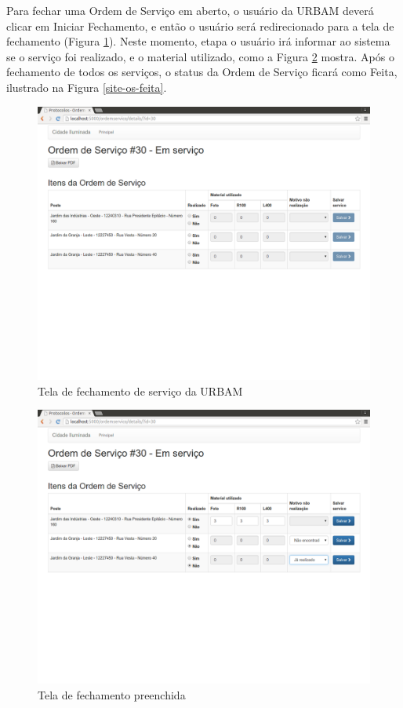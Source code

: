 \documentclass[
	article,			%
	11pt,				%
	oneside,			%
	a4paper,			%
	english,			%
	brazil,				%
	sumario=tradicional
	]{abntex2}
\begin{document}
\clearpage

Para fechar uma Ordem de Serviço em aberto, o usuário da URBAM deverá clicar em Iniciar Fechamento,
e então o usuário será redirecionado para a tela de fechamento (Figura \ref{site-fechamento-urbam}).
Neste momento, etapa o usuário irá informar ao sistema se o serviço foi realizado, e o
material utilizado, como a Figura \ref{site-material-e-motivo} mostra. Após o fechamento de todos os
serviços, o status da Ordem de Serviço ficará como Feita, ilustrado na Figura \ref{site-os-feita}.

\begin{figure}[!htbp]
 \centering
 \caption{\label{site-fechamento-urbam}Tela de fechamento de serviço da URBAM}
 \includegraphics[scale=0.25]{site/15-fechamento_urbam.png}
\end{figure}

\begin{figure}[!htbp]
 \centering
 \caption{\label{site-material-e-motivo}Tela de fechamento preenchida}
 \includegraphics[scale=0.25]{site/16-material_e_motivo.png}
\end{figure}
\end{document}
